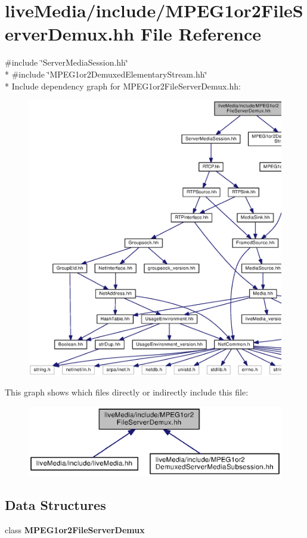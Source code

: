 \section{live\+Media/include/\+M\+P\+E\+G1or2\+File\+Server\+Demux.hh File Reference}
\label{MPEG1or2FileServerDemux_8hh}
{\ttfamily \#include \char`\"{}Server\+Media\+Session.\+hh\char`\"{}}\\*
{\ttfamily \#include \char`\"{}M\+P\+E\+G1or2\+Demuxed\+Elementary\+Stream.\+hh\char`\"{}}\\*
Include dependency graph for M\+P\+E\+G1or2\+File\+Server\+Demux.\+hh\+:
\nopagebreak
\begin{figure}[H]
\begin{center}
\leavevmode
\includegraphics[width=350pt]{MPEG1or2FileServerDemux_8hh__incl}
\end{center}
\end{figure}
This graph shows which files directly or indirectly include this file\+:
\nopagebreak
\begin{figure}[H]
\begin{center}
\leavevmode
\includegraphics[width=350pt]{MPEG1or2FileServerDemux_8hh__dep__incl}
\end{center}
\end{figure}
\subsection*{Data Structures}
\begin{DoxyCompactItemize}
\item 
class {\bf M\+P\+E\+G1or2\+File\+Server\+Demux}
\end{DoxyCompactItemize}
